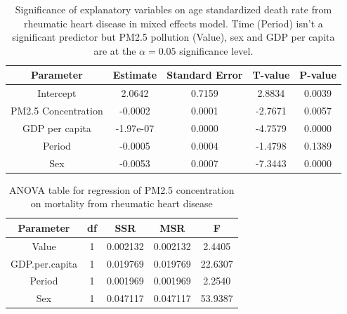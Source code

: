 \documentclass[12pt, letterpaper, twoside]{article}
\begin{document}
\begin{table}[h!]
\centering
\begin{tabular}{|c | c c c c|}
\toprule
Parameter & Estimate & Standard Error & T-value & P-value \\ [0.5ex]
\midrule
Intercept &	2.0642 &	0.7159 &	2.8834 &	0.0039 \\
PM2.5 Concentration &	-0.0002 &	0.0001 &	-2.7671 &	0.0057 \\
GDP per capita &	-1.97e-07		 &	0.0000 &	-4.7579 &	0.0000 \\
Period &	-0.0005 &	0.0004 &	-1.4798 &	0.1389 \\
Sex &	-0.0053 &	0.0007 &	-7.3443 &	0.0000 \\[1ex]
\bottomrule
\end{tabular}
\label{tab:table3}
  \caption{Significance of explanatory variables on age standardized death rate
  from rheumatic heart disease in mixed effects model. Time (Period) isn't a
  significant predictor but PM2.5 pollution (Value), sex and GDP per capita are
  at the \begin{math}\alpha = 0.05\end{math} significance level.}
\end{table}

\begin{table}[h!]
\centering
\begin{tabular}{|c | c c c c|}
\toprule
Parameter & df & SSR & MSR & F \\ [0.5ex]
\midrule
Value & 1 & 0.002132 & 0.002132 & 2.4405 \\
GDP.per.capita & 1 & 0.019769 & 0.019769 & 22.6307 \\
Period & 1 & 0.001969 & 0.001969 & 2.2540 \\
Sex & 1 & 0.047117 & 0.047117 & 53.9387 \\ [1ex]
\bottomrule
\end{tabular}
\label{tab:table4}
\caption{ANOVA table for regression of PM2.5 concentration on mortality from
rheumatic heart disease}
\end{table}
\end{document}
